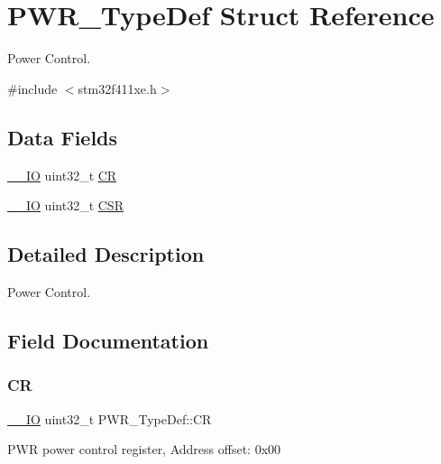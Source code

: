 \hypertarget{struct_p_w_r___type_def}{}\section{P\+W\+R\+\_\+\+Type\+Def Struct Reference}
\label{struct_p_w_r___type_def}


Power Control.  




{\ttfamily \#include $<$stm32f411xe.\+h$>$}

\subsection*{Data Fields}
\begin{DoxyCompactItemize}
\item 
\hyperlink{core__sc300_8h_aec43007d9998a0a0e01faede4133d6be}{\+\_\+\+\_\+\+IO} uint32\+\_\+t \hyperlink{struct_p_w_r___type_def_aeb6bcdb2b99d58b9a0ffd86deb606eac}{CR}
\item 
\hyperlink{core__sc300_8h_aec43007d9998a0a0e01faede4133d6be}{\+\_\+\+\_\+\+IO} uint32\+\_\+t \hyperlink{struct_p_w_r___type_def_ae17097e69c88b6c00033d6fb84a8182b}{C\+SR}
\end{DoxyCompactItemize}


\subsection{Detailed Description}
Power Control. 

\subsection{Field Documentation}
\mbox{\label{struct_p_w_r___type_def_aeb6bcdb2b99d58b9a0ffd86deb606eac}} 
\subsubsection{\texorpdfstring{CR}{CR}}
{\footnotesize\ttfamily \hyperlink{core__sc300_8h_aec43007d9998a0a0e01faede4133d6be}{\+\_\+\+\_\+\+IO} uint32\+\_\+t P\+W\+R\+\_\+\+Type\+Def\+::\+CR}

P\+WR power control register, Address offset\+: 0x00 \mbox{\label{struct_p_w_r___type_def_ae17097e69c88b6c00033d6fb84a8182b}} 
